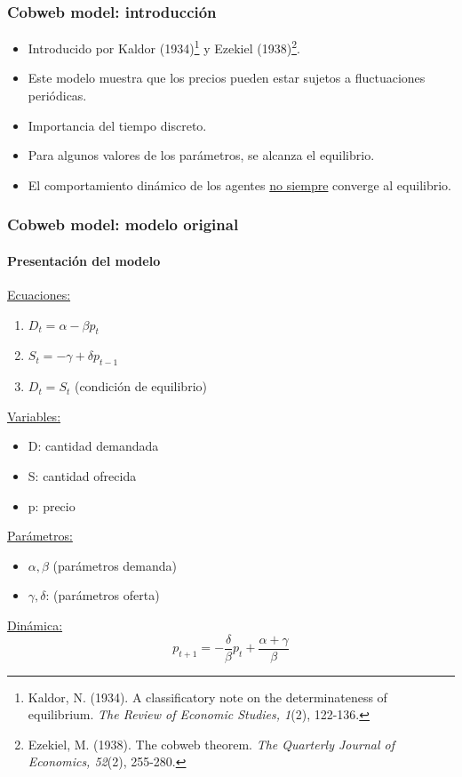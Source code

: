 \documentclass[11pt]{beamer}
\begin{document}
\begin{frame}
\frametitle{Cobweb model: introducción}
\begin{itemize}
\item Introducido por Kaldor (1934)\footnote{Kaldor, N. (1934). A classificatory note on the determinateness of equilibrium. \textit{The Review of Economic Studies, 1}(2), 122-136.} y Ezekiel (1938)\footnote{Ezekiel, M. (1938). The cobweb theorem. \textit{The Quarterly Journal of Economics, 52}(2), 255-280.}. 
	\item Este modelo muestra que los precios pueden estar sujetos a fluctuaciones periódicas.
	\item Importancia del tiempo discreto.
	\item Para algunos valores de los parámetros, se alcanza el equilibrio.
	\item El comportamiento dinámico de los agentes \underline{no siempre} converge al equilibrio.
\end{itemize}
\end{frame}

\begin{frame}
\frametitle{Cobweb model: modelo original}
\framesubtitle{Presentación del modelo}
\begin{multicols}{2}
\underline{Ecuaciones:}
\begin{enumerate}
	\item $D_t=\alpha-\beta p_t$
	\item $S_t=-\gamma+\delta p_{t-1}$
	\item $D_t=S_t$ (condición de equilibrio)
\end{enumerate}
\underline{Variables:}
\begin{itemize}
	\item D: cantidad demandada
	\item S: cantidad ofrecida
	\item p: precio
\end{itemize}
\vspace{1cm}
\underline{Parámetros: }
\begin{itemize}
	\item $\alpha, \beta$ (parámetros demanda)
	\item $\gamma, \delta$: (parámetros oferta)
\end{itemize}
\underline{Dinámica:}
\begin{equation}
p_{t+1}=-\dfrac{\delta}{\beta}p_t+\dfrac{\alpha+\gamma}{\beta}
\end{equation}	
\end{multicols}
\end{frame}
\end{document}
